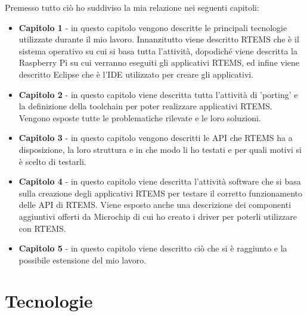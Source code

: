\documentclass[12pt, a4paper, titlepage, oneside]{book}
\begin{document}
\begin{flushleft}
Premesso tutto ciò ho suddiviso la mia relazione nei seguenti capitoli:

\begin{itemize}
    \item \textbf{Capitolo 1} - in questo capitolo vengono descritte le principali tecnologie utilizzate durante il mio lavoro. Innanzitutto viene descritto RTEMS che è il sistema operativo su cui si basa tutta l'attività, dopodiché viene  descritta la Raspberry Pi su cui verranno eseguiti gli applicativi RTEMS, ed infine viene descritto Eclipse che è l'IDE utilizzato per creare gli applicativi.
    \item \textbf{Capitolo 2} - in questo capitolo viene descritta tutta l'attività di 'porting' e la definizione della toolchain per poter realizzare applicativi RTEMS. Vengono esposte tutte le problematiche rilevate e le loro soluzioni. 
    \item \textbf{Capitolo 3} - in questo capitolo vengono descritti le API che RTEMS ha a disposizione, la loro struttura e in che modo li ho testati e per quali motivi si è scelto di testarli.
    \item \textbf{Capitolo 4} - in questo capitolo viene descritta l'attività software che si basa sulla creazione degli applicativi RTEMS per testare il corretto funzionamento delle API di RTEMS. Viene esposto anche una descrizione dei componenti aggiuntivi offerti da Microchip di cui ho creato i driver per poterli utilizzare con RTEMS.
    \item \textbf{Capitolo 5} - in questo capitolo viene descritto ciò che si è raggiunto e la possibile estensione del mio lavoro.
\end{itemize} 

\chapter{Tecnologie}

\end{flushleft}
\end{document}
